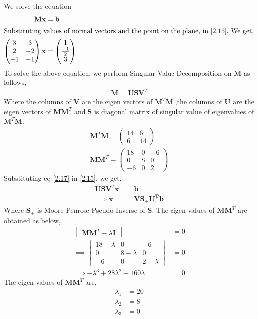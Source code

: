 \documentclass[journal,12pt,twocolumn]{IEEEtran}
\let\vec\mathbf
\numberwithin{equation}{subsection}
\newcommand{\myvec}[1]{\ensuremath{\begin{pmatrix}#1\end{pmatrix}}}
\newcommand{\mydet}[1]{\ensuremath{\begin{vmatrix}#1\end{vmatrix}}}
\begin{document}
We solve the equation
\begin{align}
\vec{M}\vec{x} &= \vec{b}\label{2.15}\\
\intertext{Substituting values of normal vectors and the point on the plane, in \ref{2.15}, We get,}
\myvec{3&3\\2&-2\\-1&-1}\vec{x} &= \myvec{1\\\frac{-1}{2}\\3}
\end{align}
To solve the above equation, we  perform Singular Value Decomposition on $\vec{M}$ as follows,
\begin{align}
\vec{M}=\vec{U}\vec{S}\vec{V}^T \label{2.17}
\end{align}
Where the columns of $\vec{V}$ are the eigen vectors of $\vec{M}^T\vec{M}$ ,the columns of $\vec{U}$ are the eigen vectors of $\vec{M}\vec{M}^T$ and $\vec{S}$ is diagonal matrix of singular value of eigenvalues of $\vec{M}^T\vec{M}$.
\begin{align}
\vec{M}^T\vec{M}=\myvec{14&6\\6&14}\\
\vec{M}\vec{M}^T=\myvec{18&0&-6\\0&8&0\\-6&0&2}
\end{align}
Substituting eq \ref{2.17} in \ref{2.15}, we get,
\begin{align}
\vec{U}\vec{S}\vec{V}^T\vec{x} & = \vec{b}\\
\implies\vec{x} &= \vec{V}\vec{S_+}\vec{U^T}\vec{b} \label{2.21}
\end{align}
Where $\vec{S_+}$ is Moore-Penrose Pseudo-Inverse of $\vec{S}$.
The eigen values of $\vec{M}\vec{M}^T$ are obtained as below,
\begin{align}
\mydet{\vec{M}\vec{M}^T - \lambda\vec{I}} &= 0\\
\implies\begin{vmatrix}18-\lambda&0&-6\\0&8-\lambda&0\\-6&0&2-\lambda\end{vmatrix} &=0\\
\implies-\lambda^3+28 \lambda^2-160\lambda &=0
\end{align}
The eigen values of $\vec{M}\vec{M}^T$ are,
\begin{align}
\lambda_1 &=20\\
\lambda_2 &= 8\\
\lambda_3 &=0
\end{align}
\end{document}
